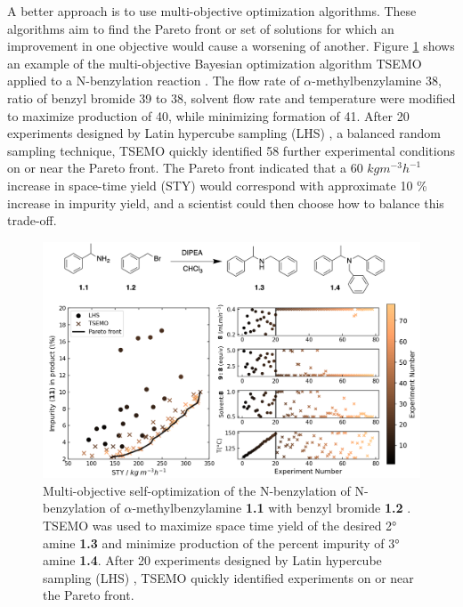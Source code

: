 A better approach is to use multi-objective optimization algorithms. These algorithms aim to find the Pareto front or set of solutions for which an improvement in one objective would cause a worsening of another. Figure \ref{fig:schweidtmann_example} shows an example of the multi-objective Bayesian optimization algorithm TSEMO \cite{Bradford2018} applied to a N-benzylation reaction \cite{Schweidtmann2018}. The flow rate of $\alpha$-methylbenzylamine 38, ratio of benzyl bromide 39 to 38, solvent flow rate and temperature were modified to maximize production of 40, while minimizing formation of 41. After 20 experiments designed by Latin hypercube sampling (LHS) \cite{McKay1979}, a balanced random sampling technique, TSEMO quickly identified 58 further experimental conditions on or near the Pareto front. The Pareto front indicated that a 60 $kg m^{-3} h^{-1}$ increase in space-time yield (STY) would correspond with approximate 10 \% increase in impurity yield, and a scientist could then choose how to balance this trade-off.

\begin{figure}
    \centering
    \includegraphics[width=\textwidth]{gfx/Chapter03/schweidtmann_thesis.png}
    \caption{Multi-objective self-optimization of the N-benzylation of N-benzylation of $\alpha$-methylbenzylamine \textbf{1.1} with benzyl bromide \textbf{1.2} \cite{Schweidtmann2018}. TSEMO \cite{Bradford2018} was used to maximize space time yield of the desired 2° amine \textbf{1.3} and minimize production of the percent impurity of 3° amine \textbf{1.4}. After 20 experiments designed by Latin hypercube sampling (LHS) \cite{McKay1979}, TSEMO quickly identified experiments on or near the Pareto front.}
    \label{fig:schweidtmann_example}
\end{figure}


